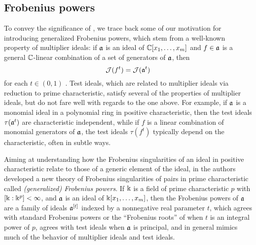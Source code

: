 \documentclass{amsart}
\begin{document}
\subsection{Frobenius powers}
To convey the significance of , we trace back some of our motivation for introducing generalized Frobenius powers, which stem from a well-known property of multiplier ideals:
if $\mathfrak{a}$ is an ideal of $\mathbb{C}[x_1,\ldots,x_m]$ and $f \in \mathfrak{a}$ is a general $\mathbb{C}$-linear combination of a set of generators of $\mathfrak{a}$, then
\[ \mathcal{J}(f^t) = \mathcal{J}(\mathfrak{a}^t)\]
for each $t \in (0,1)$ \cite[Proposition~9.2.28]{lazarsfeld.positivity-II}.
Test ideals, which are related to multiplier ideals via reduction to prime characteristic, satisfy several of the properties of multiplier ideals, but do not fare well with regards to the one above. 
For example, if $\mathfrak{a}$ is a monomial ideal in a polynomial ring in positive characteristic, then the test ideals $\tau(\mathfrak{a}^t)$ are characteristic independent, while if $f$ is a linear combination of monomial generators of $\mathfrak{a}$, the test ideals $\tau(f^t)$ typically depend on the characteristic, often in subtle ways.

Aiming at understanding how the Frobenius singularities of an ideal in positive characteristic relate to those of a generic element of the ideal, in \cite{hernandez+etal.frobenius_powers} the authors developed a new theory of Frobenius singularities of pairs in prime characteristic called \emph{\textup{(}generalized\textup{)} Frobenius powers}. 
If $\Bbbk$ is a field of prime characteristic $p$ with $[\Bbbk:\Bbbk^p] <\infty$, and $\mathfrak{a}$ is an ideal of $\Bbbk[x_1, \ldots, x_m]$, then the Frobenius powers of $\mathfrak{a}$ are a family of ideals $\mathfrak{a}^{[t]}$ indexed by a nonnegative real parameter $t$, which agrees with standard Frobenius powers or the ``Frobenius roots'' of \cite{blickle+mustata+smith.discr_rat_FPTs} when $t$ is an integral power of $p$, agrees with test ideals when $\mathfrak{a}$ is principal, and in general mimics much of the behavior of multiplier ideals and test ideals.
\end{document}
